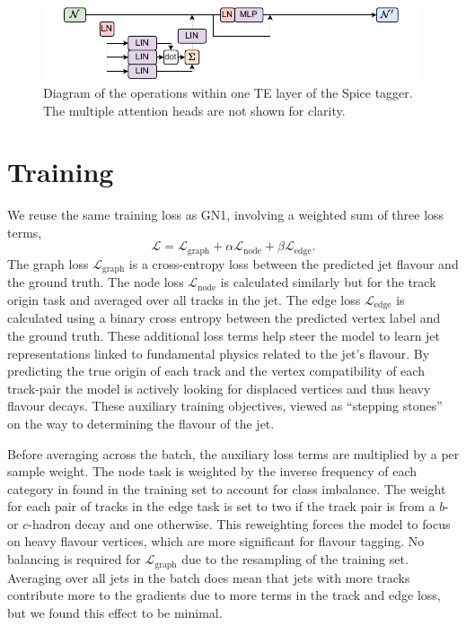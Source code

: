 \begin{figure}[h!]
    \centering
    \includegraphics[width=0.99\textwidth]{figures/flavour_tagging/spice.pdf}
    \caption{Diagram of the operations within one TE layer of the Spice tagger. The multiple attention heads are not shown for clarity.}
    \label{fig:spice_graph}
\end{figure}

\section{Training}

We reuse the same training loss as GN1, involving a weighted sum of three loss terms,
\begin{equation}
  \mathcal{L} = \mathcal{L}_{\text{graph}} + \alpha \mathcal{L}_{\text{node}} + \beta \mathcal{L}_{\text{edge}}.
\end{equation}
The graph loss $\mathcal{L}_{\text{graph}}$ is a cross-entropy loss between the predicted jet flavour and the ground truth.
The node loss $\mathcal{L}_{\text{node}}$ is calculated similarly but for the track origin task and averaged over all tracks in the jet.
The edge loss $\mathcal{L}_{\text{edge}}$ is calculated using a binary cross entropy between the predicted vertex label and the ground truth.
These additional loss terms help steer the model to learn jet representations linked to fundamental physics related to the jet's flavour.
By predicting the true origin of each track and the vertex compatibility of each track-pair the model is actively looking for displaced vertices and thus heavy flavour decays.
These auxiliary training objectives, viewed as ``stepping stones''~\cite{GN1} on the way to determining the flavour of the jet.

Before averaging across the batch, the auxiliary loss terms are multiplied by a per sample weight.
The node task is weighted by the inverse frequency of each category in  found in the training set to account for class imbalance.
The weight for each pair of tracks in the edge task is set to two if the track pair is from a $b$- or $c$-hadron decay and one otherwise.
This reweighting forces the model to focus on heavy flavour vertices, which are more significant for flavour tagging.
No balancing is required for $\mathcal{L}_{\text{graph}}$ due to the resampling of the training set.
Averaging over all jets in the batch does mean that jets with more tracks contribute more to the gradients due to more terms in the track and edge loss, but we found this effect to be minimal.

